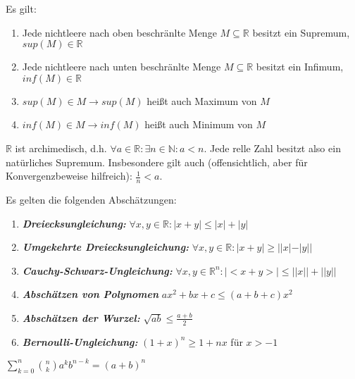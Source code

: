 \documentclass[]{article}
\begin{document}
\begin{satz}[Supremumsaxiom]
	Es gilt:
	\begin{enumerate}[noitemsep]
		\item Jede nichtleere nach oben beschränlte Menge $M \subseteq \mathbb{R}$ besitzt ein Supremum, $sup(M) \in \mathbb{R}$
		\item Jede nichtleere nach unten beschränlte Menge $M \subseteq \mathbb{R}$ besitzt ein Infimum, $inf(M) \in \mathbb{R}$
		\item $sup(M) \in M \rightarrow sup(M)$ heißt auch Maximum von $M$
		\item $inf(M) \in M \rightarrow inf(M)$ heißt auch Minimum von $M$
	\end{enumerate}
\end{satz}

\begin{satz}[Archimedizität]
	$\mathbb{R}$ ist archimedisch, d.h. $\forall a \in \mathbb{R} : \exists n \in \mathbb{N} : a < n $. Jede relle Zahl besitzt also ein natürliches Supremum. Insbesondere gilt auch (offensichtlich, aber für Konvergenzbeweise hilfreich): $\frac{1}{n} < a$.
\end{satz}

\begin{satz}[Abschätzungen]
	Es gelten die folgenden Abschätzungen:
	
	\begin{enumerate}[noitemsep]
		\item \textbf{\emph{Dreiecksungleichung:}} $\forall x, y \in \mathbb{R} : | x + y | \leq |x| + |y|$
		\item \textbf{\emph{Umgekehrte Dreiecksungleichung:}} 	$\forall x, y \in \mathbb{R} : | x + y | \geq ||x| - |y||$
		\item \textbf{\emph{Cauchy-Schwarz-Ungleichung:}} 	$\forall x, y \in \mathbb{R}^n : | <x + y> | \leq ||x|| + ||y||$
		\item \textbf{\emph{Abschätzen von Polynomen}} 	$ax^2 + bx + c \leq (a + b + c)x^2 $
		\item \textbf{\emph{Abschätzen der Wurzel:}} 	$\sqrt{ab} \leq \frac{a + b}{2}$
		\item \textbf{\emph{Bernoulli-Ungleichung:}} 	$(1+x)^n \geq 1 + nx$ für $x > -1$	
	\end{enumerate}
	
\end{satz}

\begin{satz}
	$\sum_{k=0}^{n} \binom{n}{k}a^k b^{n-k} = (a+b)^n$ 
\end{satz}
\end{document}
